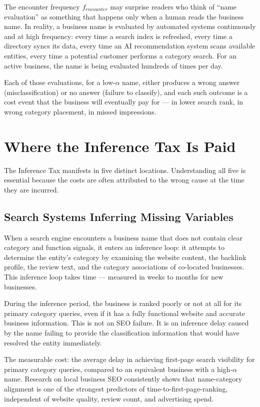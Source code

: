 \documentclass[12pt, openany]{book}
\theoremstyle{thmstyle}
\theoremstyle{defstyle}
\begin{document}
The encounter frequency $f_{encounter}$ may surprise readers who think of ``name evaluation'' as something that happens only when a human reads the business name. In reality, a business name is evaluated by automated systems continuously and at high frequency: every time a search index is refreshed, every time a directory syncs its data, every time an AI recommendation system scans available entities, every time a potential customer performs a category search. For an active business, the name is being evaluated hundreds of times per day.

Each of those evaluations, for a low-$\alpha$ name, either produces a wrong answer (misclassification) or no answer (failure to classify), and each such outcome is a cost event that the business will eventually pay for --- in lower search rank, in wrong category placement, in missed impressions.

\section{Where the Inference Tax Is Paid}

The Inference Tax manifests in five distinct locations. Understanding all five is essential because the costs are often attributed to the wrong cause at the time they are incurred.

\subsection{Search Systems Inferring Missing Variables}

When a search engine encounters a business name that does not contain clear category and function signals, it enters an inference loop: it attempts to determine the entity's category by examining the website content, the backlink profile, the review text, and the category associations of co-located businesses. This inference loop takes time --- measured in weeks to months for new businesses.

During the inference period, the business is ranked poorly or not at all for its primary category queries, even if it has a fully functional website and accurate business information. This is not an SEO failure. It is an inference delay caused by the name failing to provide the classification information that would have resolved the entity immediately.

The measurable cost: the average delay in achieving first-page search visibility for primary category queries, compared to an equivalent business with a high-$\alpha$ name. Research on local business SEO consistently shows that name-category alignment is one of the strongest predictors of time-to-first-page-ranking, independent of website quality, review count, and advertising spend.
\end{document}
